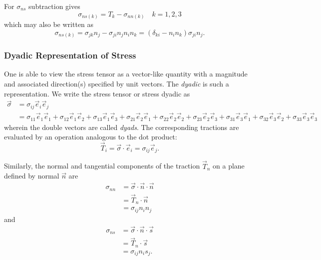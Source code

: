 For $\sigma_{ns}$ subtraction gives
\begin{equation*}
  \sigma_{ns(k)} = T_k - \sigma_{nn(k)} \quad k = 1,2,3
\end{equation*}
which may also be written as
\begin{equation*}
  \sigma_{ns(k)} = \sigma_{jk} n_j - \sigma_{ji} n_j n_i n_k = \left( \delta_{ki} - n_i n_k  \right) \sigma_{ji} n_j
.\end{equation*}

\subsubsection{Dyadic Representation of Stress}
One is able to view the stress tensor as a vector-like quantity with a magnitude and associated direction(s) specified by unit vectors.
The \textit{dyadic} is such a representation.
We write the stress tensor or stress dyadic as
\begin{align*}
  \Vec{\sigma} &= \sigma_{ij} \Vec{e}_i \Vec{e}_j \\
               &= \sigma_{11} \Vec{e}_1 \Vec{e}_1 + \sigma_{12} \Vec{e}_1 \Vec{e}_2 + \sigma_{13} \Vec{e}_1 \Vec{e}_3 + \sigma_{21} \Vec{e}_2 \Vec{e}_1 + \sigma_{22} \Vec{e}_2 \Vec{e}_2 + \sigma_{23} \Vec{e}_2 \Vec{e}_3 + \sigma_{31} \Vec{e}_3 \Vec{e}_1 + \sigma_{32} \Vec{e}_3 \Vec{e}_2 + \sigma_{33} \Vec{e}_3 \Vec{e}_3
\end{align*}
wherein the double vectors are called \textit{dyads}.
The corresponding tractions are evaluated by an operation analogous to the dot product:
\begin{equation*}
  \Vec{T}_i = \Vec{\sigma} \cdot \Vec{e}_i = \sigma_{ij} \Vec{e}_j
.\end{equation*}

Similarly, the normal and tangential components of the traction $\Vec{T}_n$ on a plane defined by normal $\Vec{n}$ are
\begin{align*}
  \sigma_{nn} &= \Vec{\sigma} \cdot \Vec{n} \cdot \Vec{n} \\
  &= \Vec{T}_n \cdot \Vec{n} \\
  &= \sigma_{ij} n_i n_j
\end{align*}
and
\begin{align*}
  \sigma_{ns} &= \Vec{\sigma}\cdot \Vec{n} \cdot \Vec{s} \\
  &= \Vec{T}_n \cdot \Vec{s} \\
  &= \sigma_{ij} n_i s_j
.\end{align*}
